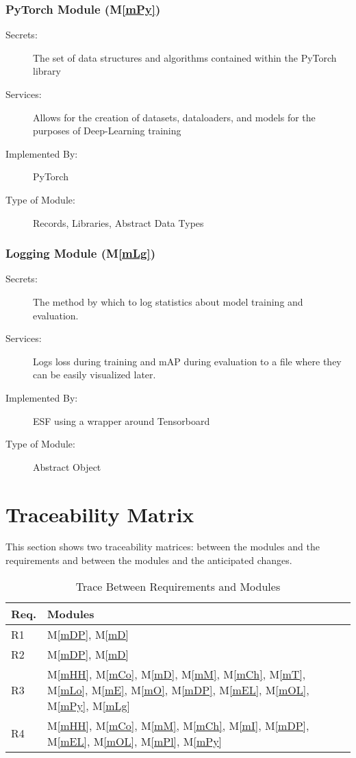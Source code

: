 \documentclass[12pt, titlepage]{article}
\newcommand{\ProjectName}{ESF }
\newcommand{\mref}[1]{M\ref{#1}}
\begin{document}
\subsubsection{PyTorch Module (\mref{mPy})}
\begin{description}
\item[Secrets:] The set of data structures and algorithms contained within the PyTorch library
\item[Services:] Allows for the creation of datasets, dataloaders, and models for the purposes of Deep-Learning training
\item[Implemented By:] PyTorch
\item[Type of Module:] Records, Libraries, Abstract Data Types
\end{description}

\subsubsection{Logging Module (\mref{mLg})}
\begin{description}
\item[Secrets:] The method by which to log statistics about model training and evaluation.
\item[Services:] Logs loss during training and mAP during evaluation to a file where they can be easily visualized later.
\item[Implemented By:] \ProjectName using a wrapper around Tensorboard
\item[Type of Module:] Abstract Object
\end{description}

\section{Traceability Matrix} \label{SecTM}

This section shows two traceability matrices: between the modules and the
requirements and between the modules and the anticipated changes.

\begin{table}[H]
\centering
\begin{tabular}{p{} p{}}
\toprule
\textbf{Req.} & \textbf{Modules}\\
\midrule
R1 & \mref{mDP}, \mref{mD}\\
R2 & \mref{mDP}, \mref{mD}\\
R3 & \mref{mHH}, \mref{mCo}, \mref{mD}, \mref{mM}, \mref{mCh}, \mref{mT}, \mref{mLo}, \mref{mE}, \mref{mO}, \mref{mDP}, \mref{mEL}, \mref{mOL}, \mref{mPy}, \mref{mLg}\\
R4 & \mref{mHH}, \mref{mCo}, \mref{mM}, \mref{mCh}, \mref{mI}, \mref{mDP}, \mref{mEL}, \mref{mOL}, \mref{mPl}, \mref{mPy}\\
\bottomrule
\end{tabular}
\caption{Trace Between Requirements and Modules}
\label{TblRT}
\end{table}
\end{document}
